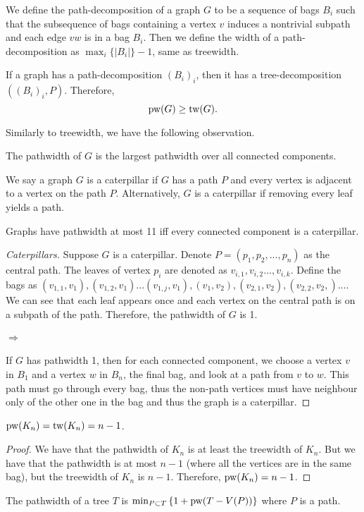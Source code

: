 We define the path-decomposition of a graph $G$ to be a sequence of bags $B_i$ such that the subsequence of bags containing a vertex $v$ induces a nontrivial subpath and each edge $vw$ is in a bag $B_i$. Then we define the width of a path-decomposition as $\max_i \lbrace |B_i| \rbrace -1$, same as treewidth.

If a graph has a path-decomposition $(B_i)_i$, then it has a tree-decomposition $\left((B_i)_i, P\right)$. Therefore,
\begin{equation}
	\text{pw}(G) \geq \text{tw}(G).
\end{equation}

Similarly to treewidth, we have the following observation.
\begin{lemma}
	The pathwidth of $G$ is the largest pathwidth over all connected components.
\end{lemma}
We say a graph $G$ is a caterpillar if $G$ has a path $P$ and every vertex is adjacent to a vertex on the path $P$. Alternatively, $G$ is a caterpillar if removing every leaf yields a path.
\begin{theorem}[Caterpillars]
	Graphs have pathwidth at most 11 iff every connected component is a caterpillar. 
\end{theorem}
\begin{proof}[Caterpillars]
	Suppose $G$ is a caterpillar. Denote $P =\left( p_1, p_2, ..., p_n\right)$ as the central path. The leaves of vertex $p_i$ are denoted as $v_{i, 1}, v_{i, 2} ..., v_{i, k}$. Define the bags as $(v_{1, 1}, v_1), (v_{1, 2}, v_1)... (v_{1, j}, v_1), (v_1, v_2), (v_{2, 1}, v_2), (v_{2,2}, v_2,)... $. We can see that each leaf appears once and each vertex on the central path is on a subpath of the path. Therefore, the pathwidth of $G$ is 1.
	\paragraph{$\Rightarrow$}
	If $G$ has pathwidth 1, then for each connected component, we choose a vertex $v$ in $B_1$ and a vertex $w$ in $B_n$, the final bag, and look at a path from $v$ to $w$. This path must go through every bag, thus the non-path vertices must have neighbour only of the other one in the bag and thus the graph is a caterpillar. 
\end{proof}
\begin{example}
	$\text{pw}(K_n) = \text{tw}(K_n) = n - 1$. 
\end{example}
\begin{proof}
	We have that the pathwidth of $K_n$ is at least the treewidth of $K_n$. But we have that the pathwidth is at most $n- 1$ (where all the vertices are in the same bag), but the treewidth of $K_n$ is $n - 1$. Therefore, $\text{pw}(K_n) = n - 1$. 
\end{proof}

\begin{example}
	The pathwidth of a tree $T$ is $\min_{P \subset T} \left\lbrace 1 + \text{pw}(T - V(P))\right\rbrace $ where $P$ is a path. 
\end{example}